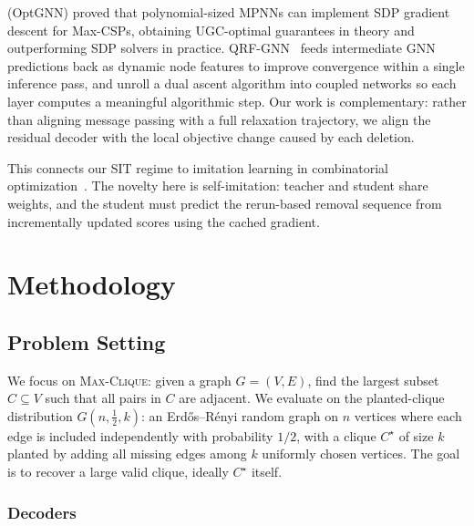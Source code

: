 \documentclass[journal,article,submit,pdftex,moreauthors]{Definitions/mdpi}
\begin{document}
\citet{yau2023} (OptGNN) proved that polynomial-sized MPNNs can implement SDP
gradient descent for Max-CSPs, obtaining UGC-optimal guarantees in theory and
outperforming SDP solvers in practice. QRF-GNN~\citep{gaile2024} feeds intermediate
GNN predictions back as dynamic node features to improve convergence within a single
inference pass, and \citet{hadou2024} unroll a dual ascent algorithm into coupled
networks so each layer computes a meaningful algorithmic step. Our work is
complementary: rather than aligning message passing with a full relaxation
trajectory, we align the residual decoder with the local objective change caused by
each deletion.


This connects our SIT regime to imitation learning in combinatorial
optimization~\citep{liu2021}. The novelty here is self-imitation: teacher and
student share weights, and the student must predict the rerun-based removal sequence
from incrementally updated scores using the cached gradient.

\section{Methodology}
\label{sec:method}

\subsection{Problem Setting}
\label{sec:problem}

We focus on \textsc{Max-Clique}: given a graph $G=(V,E)$, find the largest subset
$C \subseteq V$ such that all pairs in $C$ are adjacent. We evaluate on the
planted-clique distribution $G(n,\tfrac{1}{2},k)$: an Erd\H{o}s--R\'enyi random
graph on $n$ vertices where each edge is included independently with probability
$1/2$, with a clique $C^\star$ of size $k$ planted by adding all missing edges among
$k$ uniformly chosen vertices. The goal is to recover a large valid clique, ideally
$C^\star$ itself.

\subsubsection{Decoders}
\end{document}
